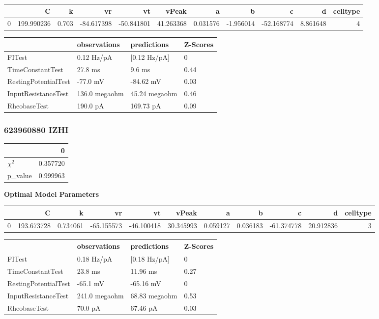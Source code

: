 \begin{tabular}{lrrrrrrrrrr}
\toprule
{} &           C &      k &         vr &         vt &      vPeak &         a &         b &          c &         d &  celltype \\
\midrule
0 &  199.990236 &  0.703 & -84.617398 & -50.841801 &  41.263368 &  0.031576 & -1.956014 & -52.168774 &  8.861648 &         4 \\
\bottomrule
\end{tabular}
\begin{tabular}{llll}
\toprule
{} &   observations &    predictions & Z-Scores \\
\midrule
FITest               &     0.12 Hz/pA &   [0.12 Hz/pA] &        0 \\
TimeConstantTest     &        27.8 ms &         9.6 ms &     0.44 \\
RestingPotentialTest &       -77.0 mV &      -84.62 mV &     0.03 \\
InputResistanceTest  &  136.0 megaohm &  45.24 megaohm &     0.46 \\
RheobaseTest         &       190.0 pA &      169.73 pA &     0.09 \\
\bottomrule
\end{tabular}
\subsubsection{623960880 IZHI}\begin{tabular}{lr}
\toprule
{} &         0 \\
\midrule
$\chi^{2}$ &  0.357720 \\
p\_value    &  0.999963 \\
\bottomrule
\end{tabular}
\textbf{Optimal Model Parameters} \begin{tabular}{lrrrrrrrrrr}
\toprule
{} &           C &         k &         vr &         vt &      vPeak &         a &         b &          c &          d &  celltype \\
\midrule
0 &  193.673728 &  0.734061 & -65.155573 & -46.100418 &  30.345993 &  0.059127 &  0.036183 & -61.374778 &  20.912836 &         3 \\
\bottomrule
\end{tabular}
\begin{tabular}{llll}
\toprule
{} &   observations &    predictions & Z-Scores \\
\midrule
FITest               &     0.18 Hz/pA &   [0.18 Hz/pA] &        0 \\
TimeConstantTest     &        23.8 ms &       11.96 ms &     0.27 \\
RestingPotentialTest &       -65.1 mV &      -65.16 mV &        0 \\
InputResistanceTest  &  241.0 megaohm &  68.83 megaohm &     0.53 \\
RheobaseTest         &        70.0 pA &       67.46 pA &     0.03 \\
\bottomrule
\end{tabular}
